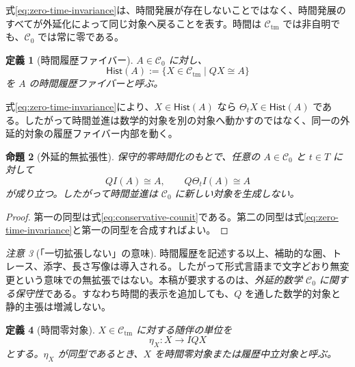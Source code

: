 \documentclass[a4paper,11pt]{ltjsarticle}
\newtheorem{definition}{定義}[section]
\newtheorem{proposition}[definition]{命題}
\theoremstyle{remark}
\newtheorem{remark}[definition]{注意}
\newcommand{\C}{\mathcal C}
\begin{document}
式\eqref{eq:zero-time-invariance}は、時間発展が存在しないことではなく、時間発展のすべてが外延化によって同じ対象へ戻ることを表す。時間は $\C_{\mathrm{tm}}$ では非自明でも、$\C_0$ では常に零である。

\begin{definition}[時間履歴ファイバー]
$A\in\C_0$ に対し、
\begin{equation}
 \mathsf{Hist}(A)
 :=\{X\in\C_{\mathrm{tm}}\mid QX\cong A\}
 \label{eq:history-fiber}
\end{equation}
を $A$ の\emph{時間履歴ファイバー}と呼ぶ。
\end{definition}

式\eqref{eq:zero-time-invariance}により、$X\in\mathsf{Hist}(A)$ なら $\Theta_tX\in\mathsf{Hist}(A)$ である。したがって時間並進は数学的対象を別の対象へ動かすのではなく、同一の外延的対象の履歴ファイバー内部を動く。

\begin{proposition}[外延的無拡張性]
保守的零時間化のもとで、任意の $A\in\C_0$ と $t\in T$ に対して
\begin{equation}
 QI(A)\cong A,
 \qquad
 Q\Theta_tI(A)\cong A
 \label{eq:no-extensional-extension}
\end{equation}
が成り立つ。したがって時間並進は $\C_0$ に新しい対象を生成しない。
\end{proposition}

\begin{proof}
第一の同型は式\eqref{eq:conservative-counit}である。第二の同型は式\eqref{eq:zero-time-invariance}と第一の同型を合成すればよい。
\end{proof}

\begin{remark}[「一切拡張しない」の意味]
時間履歴を記述する以上、補助的な圏、トレース、添字、長さ写像は導入される。したがって形式言語まで文字どおり無変更という意味での無拡張ではない。本稿が要求するのは、\emph{外延的数学 $\C_0$ に関する保守性}である。すなわち時間的表示を追加しても、$Q$ を通した数学的対象と静的主張は増減しない。
\end{remark}

\begin{definition}[時間零対象]
$X\in\C_{\mathrm{tm}}$ に対する随伴の単位を
\begin{equation}
 \eta_X:X\longrightarrow IQX
\end{equation}
とする。$\eta_X$ が同型であるとき、$X$ を\emph{時間零対象}または\emph{履歴中立対象}と呼ぶ。
\end{definition}
\end{document}
